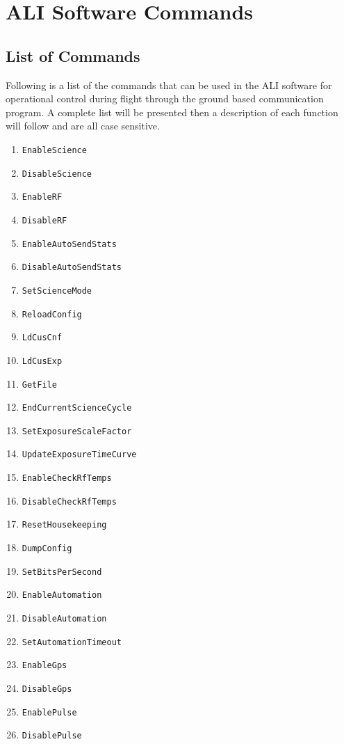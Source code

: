 \chapter{ALI Software Commands}

\section{List of Commands}
\label{sec:B.1:SoftwareCommands}

Following is a list of the commands that can be used in the ALI software for operational control during flight through the ground based communication program. A complete list will be presented then a description of each function will follow and are all case sensitive.

\begin{enumerate}
    \item \texttt{EnableScience}
    \item \texttt{DisableScience}
    \item \texttt{EnableRF}
    \item \texttt{DisableRF}
    \item \texttt{EnableAutoSendStats}
    \item \texttt{DisableAutoSendStats}
    \item \texttt{SetScienceMode}
    \item \texttt{ReloadConfig}
    \item \texttt{LdCusCnf}
    \item \texttt{LdCusExp}
    \item \texttt{GetFile}
    \item \texttt{EndCurrentScienceCycle}
    \item \texttt{SetExposureScaleFactor}
    \item \texttt{UpdateExposureTimeCurve}
    \item \texttt{EnableCheckRfTemps}
    \item \texttt{DisableCheckRfTemps}
    \item \texttt{ResetHousekeeping}
    \item \texttt{DumpConfig}
    \item \texttt{SetBitsPerSecond}
    \item \texttt{EnableAutomation}
    \item \texttt{DisableAutomation}
    \item \texttt{SetAutomationTimeout}
    \item \texttt{EnableGps}
    \item \texttt{DisableGps}
    \item \texttt{EnablePulse}
    \item \texttt{DisablePulse}
\end{enumerate}

